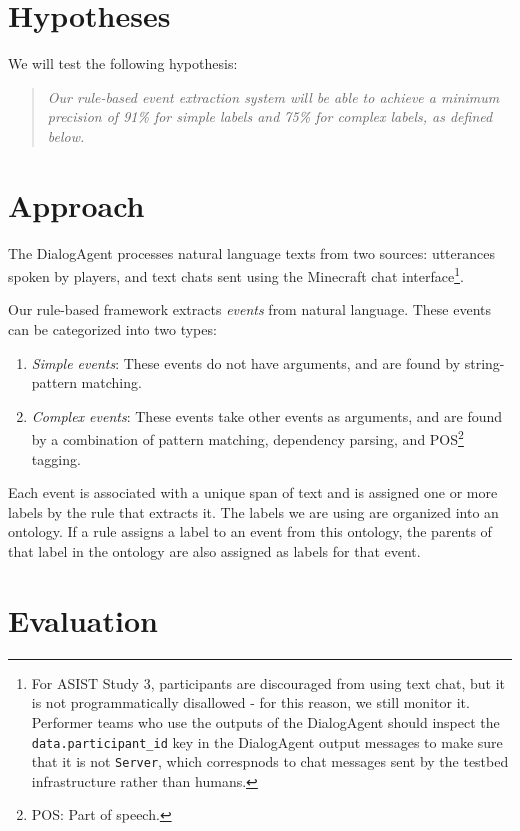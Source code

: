 \section{Hypotheses}

We will test the following hypothesis: 

\begin{quote}
    \itshape
    Our rule-based event extraction system will be able to achieve a minimum
    precision of 91\% for simple labels and 75\% for complex labels, as defined
    below.
\end{quote}

\section{Approach}

The DialogAgent processes natural language texts from two sources: utterances
spoken by players, and text chats sent using the Minecraft chat
interface\footnote{For ASIST Study 3, participants are discouraged from using
    text chat, but it is not programmatically disallowed - for this reason, we
    still monitor it. Performer teams who use the outputs of the DialogAgent
    should inspect the \texttt{data.participant\_id} key in the DialogAgent
    output messages to make sure that it is not \texttt{Server}, which
correspnods to chat messages sent by the testbed infrastructure rather than
humans.}.

Our rule-based framework extracts \emph{events} from natural language. These
events can be categorized into two types:

\begin{enumerate}
    \item \emph{Simple events}: These events do not have arguments, and are
        found by string-pattern matching.
    \item \emph{Complex events}: These events take other events as arguments,
        and are found by a combination of pattern matching, dependency parsing,
        and POS\footnote{POS: Part of speech.} tagging.
\end{enumerate}
    
Each event is associated with a unique span of text and is assigned one or more
labels by the rule that extracts it. The labels we are using are organized into
an ontology.  If a rule assigns a label to an event from this ontology, the
parents of that label in the ontology are also assigned as labels for that
event.

\section{Evaluation}

